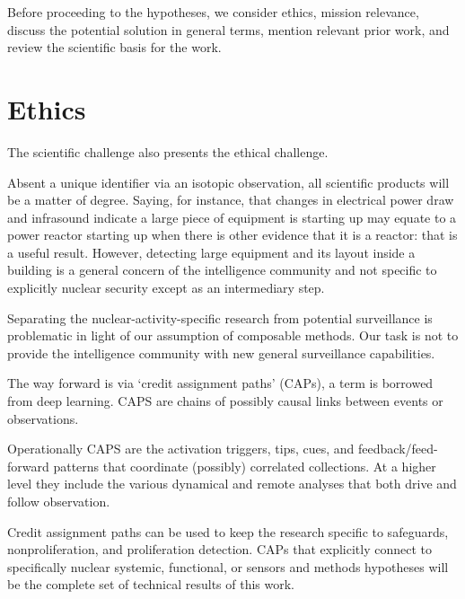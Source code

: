 \documentclass{article} %
\begin{document}
Before proceeding to the hypotheses, we consider ethics, mission relevance, discuss the potential solution in general terms, mention relevant prior work, and review the scientific basis for the work.

\pagebreak
\section {Ethics }
The scientific challenge also presents the ethical challenge. 

Absent a unique identifier via an isotopic observation, all scientific products will be a matter of degree. Saying, for instance, that changes in electrical power draw and infrasound indicate a large piece of equipment is starting up may equate to a power reactor starting up when there is other evidence that it is a reactor: that is a useful result. However, detecting large equipment and its layout inside a building is a general concern of the intelligence community and not specific to explicitly nuclear security except as an intermediary step.

Separating the nuclear-activity-specific research from potential surveillance is problematic in light of our assumption of composable methods. Our task is not to provide the intelligence community with new general surveillance capabilities. 

The way forward is via `credit assignment paths' (CAPs), a term is borrowed from deep learning. CAPS are chains of possibly causal links between events or observations. 

Operationally CAPS are the activation triggers, tips, cues, and feedback/feed-forward patterns that coordinate (possibly) correlated collections. At a higher level they include the various dynamical and remote analyses that both drive and follow observation.

Credit assignment paths can be used to keep the research specific to safeguards, nonproliferation, and proliferation detection. CAPs that explicitly connect to specifically nuclear systemic, functional, or sensors and methods hypotheses will be the complete set of technical results of this work.

\newpage
\end{document}
